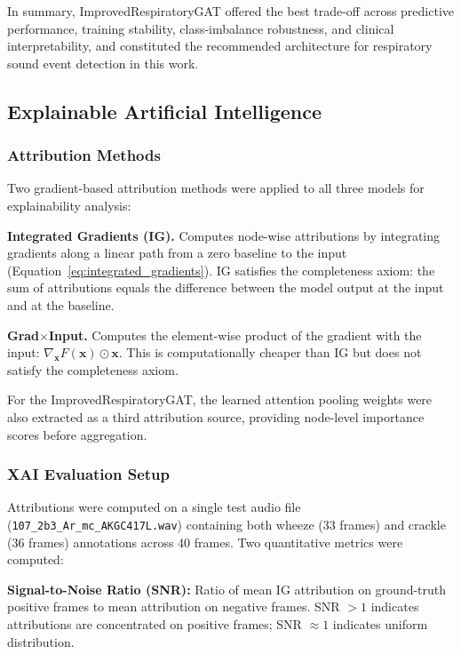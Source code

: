 In summary, ImprovedRespiratoryGAT offered the best trade-off across
predictive performance, training stability, class-imbalance robustness,
and clinical interpretability, and constituted the recommended
architecture for respiratory sound event detection in this work.

\subsection{Explainable Artificial Intelligence}

\subsubsection{Attribution Methods}

Two gradient-based attribution methods were applied to all three models
for explainability analysis:

\textbf{Integrated Gradients (IG).} Computes node-wise attributions by
integrating gradients along a linear path from a zero baseline to the input
(Equation~\ref{eq:integrated_gradients}). IG satisfies the
completeness axiom: the sum of attributions equals the difference between
the model output at the input and at the baseline.

\textbf{Grad$\times$Input.} Computes the element-wise product of the
gradient with the input: $\nabla_{\mathbf{x}} F(\mathbf{x}) \odot
\mathbf{x}$. This is computationally cheaper than IG but does not satisfy
the completeness axiom.

For the ImprovedRespiratoryGAT, the learned attention pooling weights
were also extracted as a third attribution source, providing
node-level importance scores before aggregation.

\subsubsection{XAI Evaluation Setup}

Attributions were computed on a single test audio file
(\texttt{107\_2b3\_Ar\_mc\_AKGC417L.wav}) containing both wheeze (33
frames) and crackle (36 frames) annotations across 40 frames. Two
quantitative metrics were computed:

\textbf{Signal-to-Noise Ratio (SNR):} Ratio of mean IG attribution on
ground-truth positive frames to mean attribution on negative frames.
SNR $> 1$ indicates attributions are concentrated on positive frames;
SNR $\approx 1$ indicates uniform distribution.


